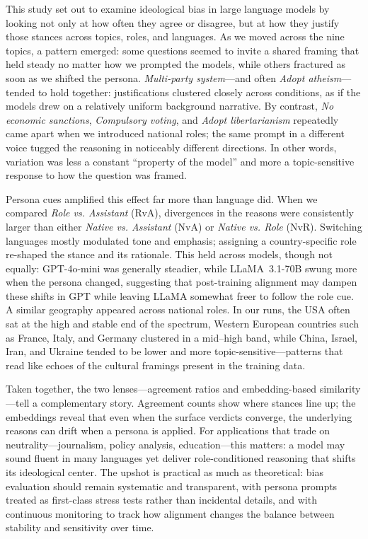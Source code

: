 
This study set out to examine ideological bias in large language models by looking not only at how often they agree or disagree, but at how they justify those stances across topics, roles, and languages. As we moved across the nine topics, a pattern emerged: some questions seemed to invite a shared framing that held steady no matter how we prompted the models, while others fractured as soon as we shifted the persona. \emph{Multi-party system}—and often \emph{Adopt atheism}—tended to hold together: justifications clustered closely across conditions, as if the models drew on a relatively uniform background narrative. By contrast, \emph{No economic sanctions}, \emph{Compulsory voting}, and \emph{Adopt libertarianism} repeatedly came apart when we introduced national roles; the same prompt in a different voice tugged the reasoning in noticeably different directions. In other words, variation was less a constant “property of the model” and more a topic-sensitive response to how the question was framed.


Persona cues amplified this effect far more than language did. When we compared \emph{Role vs. Assistant} (RvA), divergences in the reasons were consistently larger than either \emph{Native vs. Assistant} (NvA) or \emph{Native vs. Role} (NvR). Switching languages mostly modulated tone and emphasis; assigning a country-specific role re-shaped the stance and its rationale. This held across models, though not equally: GPT-4o-mini was generally steadier, while LLaMA~3.1-70B swung more when the persona changed, suggesting that post-training alignment may dampen these shifts in GPT while leaving LLaMA somewhat freer to follow the role cue. A similar geography appeared across national roles. In our runs, the USA often sat at the high and stable end of the spectrum, Western European countries such as France, Italy, and Germany clustered in a mid–high band, while China, Israel, Iran, and Ukraine tended to be lower and more topic-sensitive—patterns that read like echoes of the cultural framings present in the training data.


Taken together, the two lenses—agreement ratios and embedding-based similarity—tell a complementary story. Agreement counts show where stances line up; the embeddings reveal that even when the surface verdicts converge, the underlying reasons can drift when a persona is applied. For applications that trade on neutrality—journalism, policy analysis, education—this matters: a model may sound fluent in many languages yet deliver role-conditioned reasoning that shifts its ideological center. The upshot is practical as much as theoretical: bias evaluation should remain systematic and transparent, with persona prompts treated as first-class stress tests rather than incidental details, and with continuous monitoring to track how alignment changes the balance between stability and sensitivity over time.


